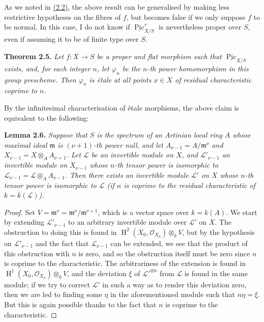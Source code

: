 \documentclass{article}
\newenvironment{itenv}[1]
  {\phantomsection\par\smallskip\noindent\textbf{#1.}\itshape}
  {\par\smallskip}
\newcommand{\oldpage}[1]{\marginpar{\footnotesize$\Big\vert$ \textit{p.~#1}}}
\theoremstyle{definition}
\theoremstyle{definition}
\theoremstyle{definition}
\theoremstyle{definition}
\theoremstyle{remark}
\begin{document}
As we noted in \protect\hyperlink{fga-3-vi-remark-2.2}{(2.2)}, the above result can be generalised by making less restrictive hypotheses on the fibres of \(f\), but becomes false if we only suppose \(f\) to be normal.
In this case, I do not know if \(\underline{\operatorname{Pic}}_{X/S}^\tau\) is nevertheless proper over \(S\), even if assuming it to be of finite type over \(S\).

\leavevmode{}%
\begin{itenv}{Theorem 2.5}
\oldpage{236-13}Let \(f\colon X\to S\) be a proper and flat morphism such that \(\underline{\operatorname{Pic}}_{X/S}\) exists, and, for each integer \(n\), let \(\varphi_n\) be the \(n\)-th power homomorphism in this group prescheme.
Then \(\varphi_n\) is étale at all points \(x\in X\) of residual characteristic coprime to \(n\).

\end{itenv}

By the infinitesimal characterisation of étale morphisms, the above claim is equivalent to the following:

\leavevmode{}%
\begin{itenv}{Lemma 2.6}
Suppose that \(S\) is the spectrum of an Artinian local ring \(A\) whose maximal ideal \({\mathfrak{m}}\) is \((\nu+1)\)-th power null, and let \(A_{\nu-1}=A/{\mathfrak{m}}^\nu\) and \(X_{\nu-1}=X\otimes_A A_{\nu=1}\).
Let \({\mathscr{L}}\) be an invertible module on \(X\), and \({\mathscr{L}}'_{\nu-1}\) an invertible module on \(X_{\nu-1}\) whose \(n\)-th tensor power is isomorphic to \({\mathscr{L}}_{\nu-1}={\mathscr{L}}\otimes_A A_{\nu-1}\).
Then there exists an invertible module \({\mathscr{L}}'\) on \(X\) whose \(n\)-th tensor power is isomorphic to \({\mathscr{L}}\) (if \(n\) is coprime to the residual characteristic of \(k=k({\mathscr{L}})\)).

\end{itenv}

\begin{proof}
Set \(V={\mathfrak{m}}^\nu={\mathfrak{m}}^\nu/{\mathfrak{m}}^{\nu+1}\), which is a vector space over \(k=k(A)\).
We start by extending \({\mathscr{L}}'_{\nu-1}\) to an arbitrary invertible module over \({\mathscr{L}}'\) on \(X\).
The obstruction to doing this is found in \(\operatorname{H}^2(X_0,{\mathscr{O}}_{X_0})\otimes_k V\), but by the hypothesis on \({\mathscr{L}}'_{\nu-1}\) and the fact that \({\mathscr{L}}_{\nu-1}\) can be extended, we see that the product of this obstruction with \(n\) is zero, and so the obstruction itself must be zero since \(n\) is coprime to the characteristic.
The arbitrariness of the extension is found in \(\operatorname{H}^1(X_0,{\mathscr{O}}_{X_0})\otimes_k V\), and the deviation \(\xi\) of \({{\mathscr{L}}'}^{\otimes n}\) from \({\mathscr{L}}\) is found in the same module;
if we try to correct \({\mathscr{L}}'\) in such a way as to render this deviation zero, then we are led to finding some \(\eta\) in the aforementioned module such that \(n\eta=\xi\).
But this is again possible thanks to the fact that \(n\) is coprime to the characteristic.
\end{proof}
\end{document}
